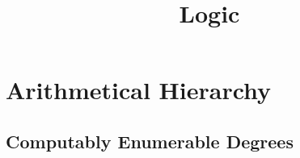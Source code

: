 \documentclass{article}
\begin{document}
\title{Logic}
\maketitle



\section{Arithmetical Hierarchy}
  \subsection{Computably Enumerable Degrees}
    
%    
%    
%    
%    
\end{document}
